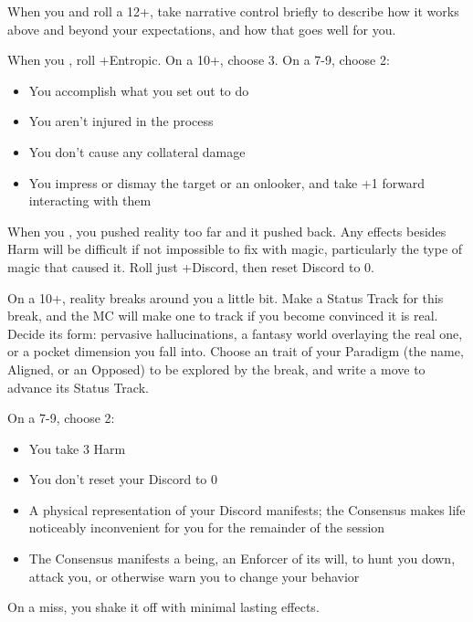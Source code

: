 \begin{multicols}{3}
  \SEPARATOR

  \begin{move}
    When you  and
    roll a 12+, take narrative control briefly to describe how it
    works above and beyond your expectations, and how that goes well
    for you.
  \end{move}

  \columnbreak
  
  \begin{move}
    When you , roll +Entropic. On a 10+, choose 3. On a
    7-9, choose 2:
    \begin{itemize}
      \setlength\itemsep{0em}
    \item You accomplish what you set out to do
    \item You aren't injured in the process
    \item You don't cause any collateral damage
    \item You impress or dismay the target or an onlooker, and take +1
      forward interacting with them
    \end{itemize}
  \end{move}

  \SEPARATOR

  \begin{move}
    When you , you pushed reality too far and it
    pushed back. Any effects besides Harm will be difficult if not
    impossible to fix with magic, particularly the type of magic that
    caused it. Roll just +Discord, then reset Discord to 0.

    On a 10+, reality breaks around you a little bit. Make a Status
    Track for this break, and the MC will make one to track if you
    become convinced it is real. Decide its form: pervasive
    hallucinations, a fantasy world overlaying the real one, or a
    pocket dimension you fall into. Choose an trait of your Paradigm
    (the name, Aligned, or an Opposed) to be explored by the break,
    and write a move to advance its Status Track.

    On a 7-9, choose 2:
    \begin{itemize}
      \setlength\itemsep{0em}
    \item You take 3 Harm
    \item You don't reset your Discord to 0
    \item A physical representation of your Discord manifests; the
      Consensus makes life noticeably inconvenient for you for the
      remainder of the session
    \item The Consensus manifests a being, an Enforcer of its will, to
      hunt you down, attack you, or otherwise warn you to change your
      behavior
    \end{itemize}

    On a miss, you shake it off with minimal lasting effects.
  \end{move}

\end{multicols}

